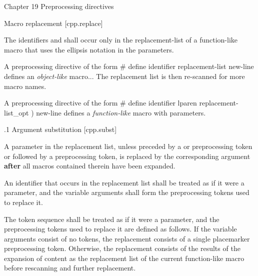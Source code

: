 


\chap Chapter 19 Preprocessing directives

 Macro replacement [cpp.replace]

The identifiers  and  shall
occur only in the replacement-list of a function-like macro that uses the
ellipsis notation in the parameters.

A preprocessing directive of the form
\begtt
# define identifier replacement-list new-line
\endtt
defines an {\it object-like} macro... The replacement list is then re-scanned
for more macro names.

A preprocessing directive of the form
\begtt
# define identifier lparen replacement-list_opt ) new-line
\endtt
defines a {\it function-like} macro with parameters.


.1 Argument substitution [cpp.subst]

A parameter in the replacement list, unless preceded by a \symbol{\#} or
\symbol{\#\#} preprocessing token or followed by a \symbol{\#\#} preprocessing
token, is replaced by the corresponding argument {\bf after} all macros contained
therein have been expanded.

An identifier  that occurs in the replacement list
shall be treated as if it were a parameter, and the variable arguments shall
form the preprocessing tokens used to replace it.

The token sequence  shall be treated as if it
were a parameter, and the preprocessing tokens used to replace it are defined as
follows. If the variable arguments consist of no tokens, the replacement
consists of a single placemarker preprocessing token.  Otherwise, the
replacement consists of the results of the expansion of content as the
replacement list of the current function-like macro before rescanning and
further replacement.

